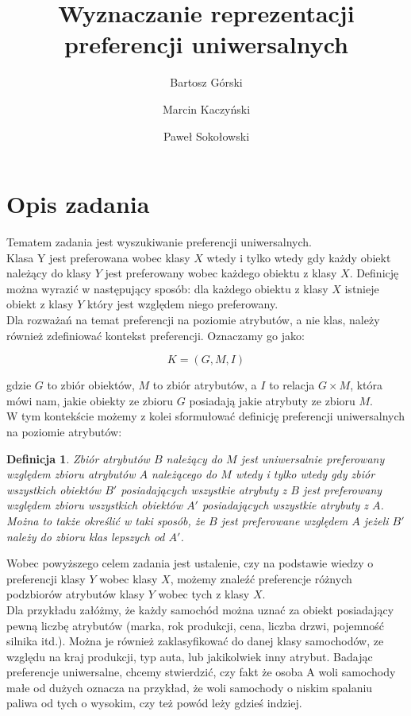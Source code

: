 \documentclass[a4paper,12pt]{article}
\title{Wyznaczanie reprezentacji preferencji uniwersalnych}
\author{Bartosz Górski \and Marcin Kaczyński \and Paweł Sokołowski}
\newtheorem{df}{Definicja}
\begin{document}
\maketitle

\section{Opis zadania} 

Tematem zadania jest wyszukiwanie preferencji uniwersalnych.\\

Klasa Y jest preferowana wobec klasy $X$ wtedy i tylko wtedy gdy każdy obiekt należący do klasy $Y$ jest preferowany wobec każdego obiektu z klasy $X$. Definicję można wyrazić w następujący sposób: dla każdego obiektu z klasy $X$ istnieje obiekt z klasy $Y$ który jest względem niego preferowany.  \\

Dla rozważań na temat preferencji na poziomie atrybutów, a nie klas, należy również zdefiniować kontekst preferencji. Oznaczamy go jako:

			$$K = (G,M,I)$$

gdzie $G$ to zbiór obiektów, $M$ to zbiór atrybutów, a $I$ to relacja $G \times M$, która mówi nam, jakie obiekty ze zbioru $G$ posiadają jakie atrybuty ze zbioru $M$. \\

W tym kontekście możemy z kolei sformułować definicję preferencji uniwersalnych na poziomie atrybutów:

\begin{df}{}{}{
Zbiór atrybutów $B$ należący do $M$ jest uniwersalnie preferowany względem zbioru atrybutów $A$ należącego do $M$ wtedy i tylko wtedy gdy zbiór wszystkich obiektów $B'$ posiadających wszystkie atrybuty z $B$ jest preferowany względem zbioru wszystkich obiektów $A'$ posiadających wszystkie atrybuty z $A$. Można to także określić w taki sposób, że $B$ jest preferowane względem $A$ jeżeli $B'$ należy do zbioru klas lepszych od $A'$.}
\end{df}

Wobec powyższego celem zadania jest ustalenie, czy na podstawie wiedzy o preferencji klasy $Y$ wobec klasy $X$, możemy znaleźć preferencje różnych podzbiorów atrybutów klasy $Y$ wobec tych z klasy $X$. \\

Dla przykładu załóżmy, że każdy samochód można uznać za obiekt posiadający pewną liczbę atrybutów (marka, rok produkcji, cena, liczba drzwi, pojemność silnika itd.). Można je również zaklasyfikować do danej klasy samochodów, ze względu na kraj produkcji, typ auta, lub jakikolwiek inny atrybut. Badając preferencje uniwersalne, chcemy stwierdzić, czy fakt że osoba A woli samochody małe od dużych oznacza na przykład, że woli samochody o niskim spalaniu paliwa od tych o wysokim, czy też powód leży gdzieś indziej.
\end{document}
